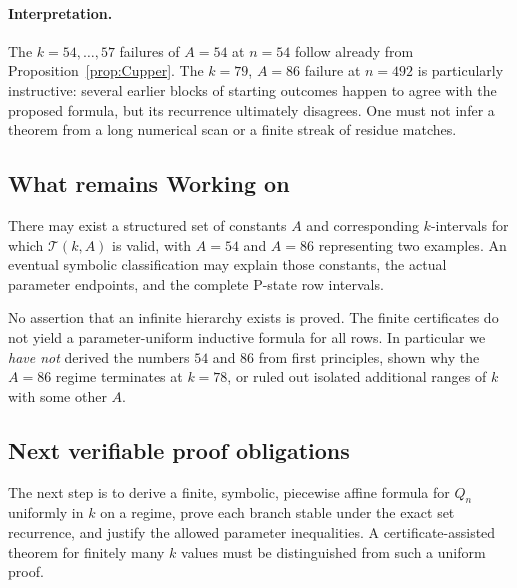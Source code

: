 \paragraph{Interpretation.} The $k=54,\ldots,57$ failures of $A=54$ at $n=54$ follow already from Proposition~\ref{prop:Cupper}. The $k=79$, $A=86$ failure at $n=492$ is particularly instructive: several earlier blocks of starting outcomes happen to agree with the proposed formula, but its recurrence ultimately disagrees. One must not infer a theorem from a long numerical scan or a finite streak of residue matches.

\subsection{What remains Working on}
\begin{conjecture}\label{conj:Chierarchy}
There may exist a structured set of constants $A$ and corresponding $k$-intervals for which $\mathcal{T}(k,A)$ is valid, with $A=54$ and $A=86$ representing two examples. An eventual symbolic classification may explain those constants, the actual parameter endpoints, and the complete P-state row intervals.
\end{conjecture}
\statusopen\quad No assertion that an infinite hierarchy exists is proved. The finite certificates do not yield a parameter-uniform inductive formula for all rows. In particular we \emph{have not} derived the numbers $54$ and $86$ from first principles, shown why the $A=86$ regime terminates at $k=78$, or ruled out isolated additional ranges of $k$ with some other $A$.

\subsection{Next verifiable proof obligations}
The next step is to derive a finite, symbolic, piecewise affine formula for $Q_n$ uniformly in $k$ on a regime, prove each branch stable under the exact set recurrence, and justify the allowed parameter inequalities. A certificate-assisted theorem for finitely many $k$ values must be distinguished from such a uniform proof.\par
